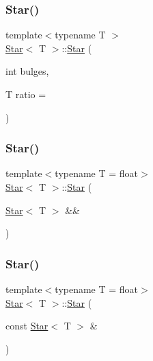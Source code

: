 \mbox{\label{classStar_aa179936ed93e38e70992cb4f6e3cbff3}} 
\subsubsection{\texorpdfstring{Star()}{Star()}\hspace{0.1cm}{\footnotesize\ttfamily [2/8]}}
{\footnotesize\ttfamily template$<$typename T $>$ \\
\mbox{\hyperlink{classStar}{Star}}$<$ T $>$\+::\mbox{\hyperlink{classStar}{Star}} (\begin{DoxyParamCaption}\item[{int}]{bulges,  }\item[{T}]{ratio = {} }\end{DoxyParamCaption})}

\mbox{\label{classStar_af518471484341cad6b47ad42d4e637fe}} 
\subsubsection{\texorpdfstring{Star()}{Star()}\hspace{0.1cm}{\footnotesize\ttfamily [3/8]}}
{\footnotesize\ttfamily template$<$typename T  = float$>$ \\
\mbox{\hyperlink{classStar}{Star}}$<$ T $>$\+::\mbox{\hyperlink{classStar}{Star}} (\begin{DoxyParamCaption}\item[{\mbox{\hyperlink{classStar}{Star}}$<$ T $>$ \&\&}]{ }\end{DoxyParamCaption})\hspace{0.3cm}{\ttfamily [default]}}

\mbox{\label{classStar_a047ce2a8d4fb409858555aee98b33c93}} 
\subsubsection{\texorpdfstring{Star()}{Star()}\hspace{0.1cm}{\footnotesize\ttfamily [4/8]}}
{\footnotesize\ttfamily template$<$typename T  = float$>$ \\
\mbox{\hyperlink{classStar}{Star}}$<$ T $>$\+::\mbox{\hyperlink{classStar}{Star}} (\begin{DoxyParamCaption}\item[{const \mbox{\hyperlink{classStar}{Star}}$<$ T $>$ \&}]{ }\end{DoxyParamCaption})\hspace{0.3cm}{\ttfamily [default]}}

